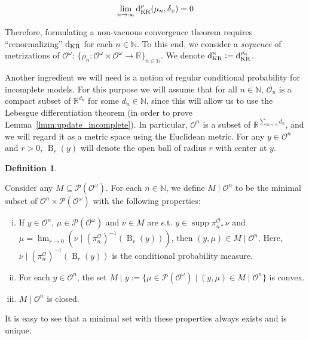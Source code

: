 \documentclass[11pt]{article}
\theoremstyle{definition}
\newtheorem{definition}{Definition}%
\theoremstyle{plain}
\newcommand{\Nats}{\mathbb{N}}
\newcommand{\Reals}{\mathbb{R}}
\newcommand{\Sq}[2]{\{#1\}_{#2 \in \Nats}}
\newcommand{\Sqn}[1]{\Sq{#1}{n}}
\newcommand{\B}{\operatorname{B}}
\newcommand{\PM}{\mathcal{P}}
\DeclareMathOperator{\Sp}{supp}
\newcommand{\DKR}{\operatorname{d}_{\textnormal{KR}}}
\newcommand{\Ob}{\mathcal{O}}
\newcommand{\OO}{\Ob^\omega}
\newcommand{\PO}{\pi^\Ob}
\newcommand{\PMO}{\PM(\OO)}
\begin{document}
\begin{equation}
\lim_{n \rightarrow \infty} \DKR^\rho(\mu_n, \delta_x) = 0
\end{equation}

Therefore, formulating a non-vacuous convergence theorem requires \enquote{renormalizing} $\DKR$ for each $n \in \Nats$. To this end, we consider a \emph{sequence} of metrizations of $\OO$: $\Sqn{\rho_n: \OO \times \OO \rightarrow \Reals}$. We denote $\DKR^n:=\DKR^{\rho_n}$.

Another ingredient we will need is a notion of regular conditional probability for incomplete models. For this purpose we will assume that for all $n \in \Nats$, $\Ob_n$ is a compact subset of $\Reals^{d_n}$ for some $d_n \in \Nats$, since this will allow us to use the Lebesgue differentiation theorem (in order to prove Lemma~\ref{lmm:update_incomplete}). In particular, $\Ob^n$ is a subset of $\Reals^{\sum_{m < n} d_n}$, and we will regard it as a metric space using the Euclidean metric. For any $y \in \Ob^n$ and $r > 0$, $\B_r(y)$ will denote the open ball of radius $r$ with center at $y$.

\begin{samepage}
\begin{definition}
\label{def:update_incomplete}

Consider any $M \subseteq \PMO$. For each $n \in \Nats$, we define $M \mid \Ob^n$ to be the minimal subset of $\Ob^n \times \PMO$ with the following properties:

\begin{enumerate}[i.]

\item If $y \in \Ob^n$, $\mu \in \PMO$ and $\nu \in M$ are s.t. $y \in \Sp \PO_{n*}\nu$ and $\mu = \lim_{r \rightarrow 0}{(\nu \mid (\PO_n)^{-1}(\B_r(y)))}$, then $(y,\mu) \in M \mid \Ob^n$. Here, $\nu \mid (\PO_n)^{-1}(\B_r(y))$ is the conditional probability measure.
\item For each $y \in \Ob^n$, the set $M \mid y:=\{\mu \in \PMO \mid (y,\mu) \in M \mid \Ob^n\}$ is convex.
\item $M \mid \Ob^n$ is closed.

\end{enumerate}

It is easy to see that a minimal set with these properties always exists and is unique.

\end{definition}
\end{samepage}
\end{document}
